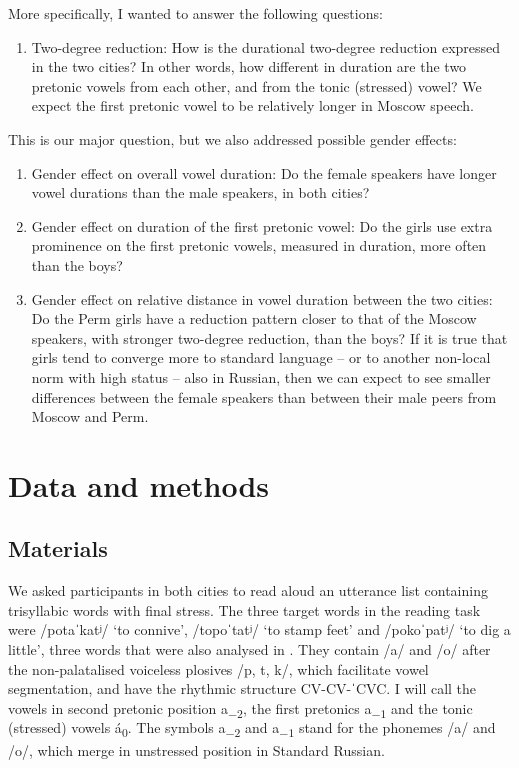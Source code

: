 \documentclass[output=paper]{langscibook}
\begin{document}
More specifically, I wanted to answer the following questions:


\begin{enumerate}
\item
Two-degree reduction: How is the durational two-degree reduction expressed in the two cities? In other words, how different in duration are the two pretonic vowels from each other, and from the tonic (stressed) vowel? We expect the first pretonic vowel to be relatively longer in Moscow speech.
\end{enumerate}

This is our major question, but we also addressed possible gender effects: 


\begin{enumerate}[resume]
\item 
Gender effect on overall vowel duration: Do the female speakers have longer vowel durations than the male speakers, in both cities?

\item 
Gender effect on duration of the first pretonic vowel: Do the girls use extra prominence on the first pretonic vowels, measured in duration, more often than the boys?

\item Gender effect on relative distance in vowel duration between the two cities: Do the Perm girls have a reduction pattern closer to that of the Moscow speakers, with stronger two-degree reduction, than the boys? If it is true that girls tend to converge more to standard language – or to another non-local norm with high status – also in Russian, then we can expect to see smaller differences between the female speakers than between their male peers from Moscow and Perm.
\end{enumerate}

\section{Data and methods}
\label{sec:post:2}
\subsection{Materials}
\label{sec:post:2.1}
We asked participants in both cities to read aloud an utterance list containing trisyllabic words with final stress. The three target words in the reading task were \mbox{/potaˈkatʲ/} `to connive', /topoˈtatʲ/ `to stamp feet' and /pokoˈpatʲ/ `to dig a little', three words that were also analysed in \citet{Vysotskij1973}. They contain \mbox{/a/} and \mbox{/o/} after the non-palatalised voiceless plosives /p, t, k/, which facilitate vowel segmentation, and have the rhythmic structure CV-CV-ˈCVC. I will call the vowels in second pretonic position a\textsubscript{$-2$}, the first pretonics a\textsubscript{$-1$} and the tonic (stressed) vowels á\textsubscript{0}. The symbols a\textsubscript{$-2$} and a\textsubscript{$-1$} stand for the phonemes \mbox{/a/} and \mbox{/o/}, which merge in unstressed position in Standard Russian.
\end{document}
